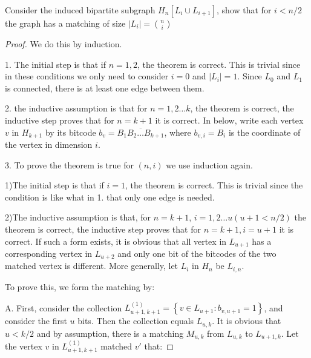 


    \maketitle

    \begin{thm}{}{}
        Consider the induced bipartite subgraph $H_n[L_i\cup L_{i+1}]$, show that for $i<n/2$ the graph has a matching of size $|L_i|=\binom{n}{i}$
    \end{thm}
    \begin{proof}
        We do this by induction. 
        
        1. The initial step is that if $n=1,2$, the theorem is correct. 
        This is trivial since in these conditions we only need to consider $i=0$ and $|L_i|=1$. 
        Since $L_0$ and $L_1$ is connected, there is at least one edge between them. 

        2. the inductive assumption is that for $n=1,2\dots k$, the theorem is correct, 
        the inductive step proves that for $n=k+1$ it is correct. 
        In below, write each vertex $v$ in $H_{k+1}$ by its bitcode $b_v=\overline{B_1B_2\dots B_{k+1}}$, 
        where $b_{v,i}=B_i$ is the coordinate of the vertex in dimension $i$. 

        3. To prove the theorem is true for $(n, i)$ we use induction again. 
        
        1)The initial step is that if $i=1$, the theorem is correct. 
        This is trivial since the condition is like what in 1. that only one edge is needed. 

        2)The inductive assumption is that, for $n=k+1$, $i=1,2\dots u(u+1<n/2)$ the theorem is correct, 
        the inductive step proves that for $n=k+1,i=u+1$ it is correct. 
        If such a form exists, it is obvious that all vertex in $L_{u+1}$ has a corresponding vertex in 
        $L_{u+2}$ and only one bit of the bitcodes of the two matched vertex is different. 
        More generally, let $L_i$ in $H_n$ be $L_{i,n}$. 

        To prove this, we form the matching by: 

        A. First, consider the collection $L_{u+1, k+1}^{(1)}=\left\{v\in L_{u+1}:b_{v,u+1}=1\right\}$, 
        and consider the first $u$ bits. Then the collection equals $L_{u, k}$. 
        It is obvious that $u<k/2$ and by assumption, there is a matching $M_{u,k}$ 
        from $L_{u,k}$ to $L_{u+1,k}$. Let the vertex $v$ in $L_{u+1,k+1}^{(1)}$ matched $v'$ that: 
        

\end{proof}
